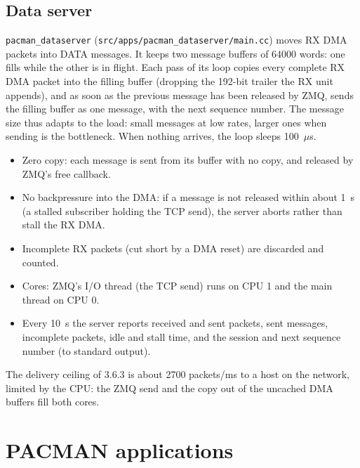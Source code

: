 \documentclass[12pt]{article}
\newcommand{\f}[1]{\texttt{#1}}
\begin{document}
\subsection{Data server}\label{sec:dataserver}

\f{pacman\_dataserver} (\f{src/apps/pacman\_dataserver/main.cc}) moves RX DMA packets into DATA
messages.  It keeps two message buffers of 64000 words:  one fills while the other is in flight.
Each pass of its loop copies every complete RX DMA packet into the filling buffer (dropping the
192-bit trailer the RX unit appends), and as soon as the previous message has been released by ZMQ,
sends the filling buffer as one message, with the next sequence number.  The message size thus adapts
to the load:  small messages at low rates, larger ones when sending is the bottleneck.  When nothing
arrives, the loop sleeps 100~$\mu$s.

\begin{itemize}
\item Zero copy:  each message is sent from its buffer with no copy, and released by ZMQ's free
  callback.
\item No backpressure into the DMA:  if a message is not released within about 1~s (a stalled
  subscriber holding the TCP send), the server aborts rather than stall the RX DMA.
\item Incomplete RX packets (cut short by a DMA reset) are discarded and counted.
\item Cores:  ZMQ's I/O thread (the TCP send) runs on CPU 1 and the main thread on CPU 0.
\item Every 10~s the server reports received and sent packets, sent messages, incomplete packets,
  idle and stall time, and the session and next sequence number (to standard output).
\end{itemize}
The delivery ceiling of 3.6.3 is about 2700 packets/ms to a host on the network, limited by the CPU:
the ZMQ send and the copy out of the uncached DMA buffers fill both cores.

\section{PACMAN applications}\label{sec:apps}
\end{document}
